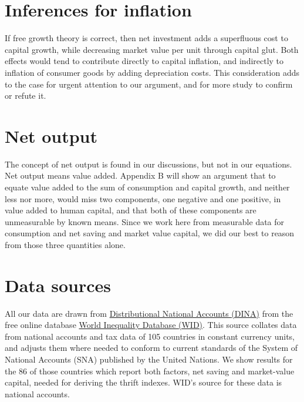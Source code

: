 \documentclass[a4paper,fleqn]{latex_styles/cas-sc}
\begin{document}
\section{Inferences for inflation}

If free growth theory is correct, then net investment adds a superfluous cost to capital growth, while decreasing market value per unit through capital glut. Both effects would tend to contribute directly to capital inflation, and indirectly to inflation of consumer goods by adding depreciation costs. This consideration adds to the case for urgent attention to our argument, and for more study to confirm or refute it.

\hypertarget{net-output}{
\section{Net output}\label{net-output}
}
The concept of net output is found in our discussions, but not in our equations. Net output means value added. Appendix B will show an argument that to equate value added to the sum of consumption and capital growth, and neither less nor more, would miss two components, one negative and one positive, in value added to human capital, and that both of these components are unmeasurable by known means. Since we work here from measurable data for consumption and net saving and market value capital, we did our best to reason from those three quantities alone.
%



\hypertarget{data-sources}{%
\section{Data sources}\label{data-sources}}

All our data are drawn from \href{https://wid.world/document/distributional-national-accounts-guidelines-2020-concepts-and-methods-used-in-the-world-inequality-database/}{Distributional National Accounts (DINA)} from the free online database \href{wid.world.com}{World
Inequality Database (WID)}. This source collates data from national accounts and tax data
of 105 countries in constant currency units, and adjusts them where needed to conform to current standards of the System of National Accounts
(SNA) published by the United Nations. We show results for the 86 of
those countries which report both factors, net
saving and market-value capital, needed for deriving
the thrift indexes. WID's source for these data is national accounts.
\end{document}
